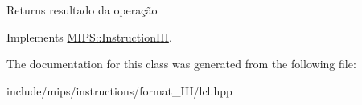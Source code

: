 \begin{DoxyReturn}{Returns}
resultado da operação 
\end{DoxyReturn}


Implements \hyperlink{classMIPS_1_1InstructionIII_aee3071c23abc542e55b446abee766c5e}{M\+I\+P\+S\+::\+Instruction\+I\+II}.



The documentation for this class was generated from the following file\+:\begin{DoxyCompactItemize}
\item 
include/mips/instructions/format\+\_\+\+I\+I\+I/lcl.\+hpp\end{DoxyCompactItemize}
